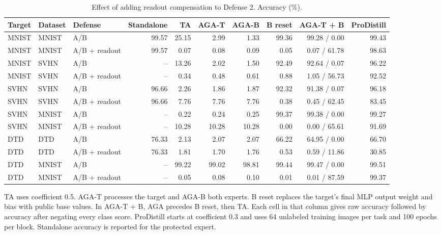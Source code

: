 \begin{table}[t]
\centering\small
\setlength{\tabcolsep}{4pt}
\caption{Effect of adding readout compensation to Defense 2. Accuracy (\%).}
\label{tab:defense2_readout}
\begin{tabular}{@{}lllrrrrrrr@{}}
\toprule
Target & Dataset & Defense & Standalone & TA & AGA-T & AGA-B & B reset & AGA-T + B & ProDistill \\
\midrule
MNIST & MNIST & A/B & 99.57 & 25.15 & 2.99 & 1.33 & 99.36 & 99.28 / 0.00 & 99.43 \\
MNIST & MNIST & A/B + readout & 99.57 & 0.07 & 0.08 & 0.09 & 0.05 & 0.07 / 61.78 & 98.63 \\
MNIST & SVHN & A/B & -- & 13.26 & 2.02 & 1.50 & 92.49 & 92.64 / 0.07 & 96.22 \\
MNIST & SVHN & A/B + readout & -- & 0.34 & 0.48 & 0.61 & 0.88 & 1.05 / 56.73 & 92.52 \\
\midrule
SVHN & SVHN & A/B & 96.66 & 2.26 & 1.86 & 1.87 & 92.32 & 91.38 / 0.07 & 96.18 \\
SVHN & SVHN & A/B + readout & 96.66 & 7.76 & 7.76 & 7.76 & 0.38 & 0.45 / 62.45 & 83.45 \\
SVHN & MNIST & A/B & -- & 0.22 & 0.24 & 0.25 & 99.37 & 99.38 / 0.00 & 99.27 \\
SVHN & MNIST & A/B + readout & -- & 10.28 & 10.28 & 10.28 & 0.00 & 0.00 / 65.61 & 91.69 \\
\midrule
DTD & DTD & A/B & 76.33 & 2.13 & 2.07 & 2.07 & 66.22 & 64.95 / 0.00 & 66.70 \\
DTD & DTD & A/B + readout & 76.33 & 1.81 & 1.70 & 1.76 & 0.53 & 0.59 / 11.86 & 30.85 \\
DTD & MNIST & A/B & -- & 99.22 & 99.02 & 98.81 & 99.44 & 99.47 / 0.00 & 99.51 \\
DTD & MNIST & A/B + readout & -- & 0.05 & 0.08 & 0.10 & 0.01 & 0.01 / 87.59 & 99.37 \\
\bottomrule
\end{tabular}
\par\smallskip
\begin{minipage}{\textwidth}\footnotesize TA uses coefficient 0.5. AGA-T processes the target and AGA-B both experts. B reset replaces the target's final MLP output weight and bias with public base values. In AGA-T + B, AGA precedes B reset, then TA. Each cell in that column gives raw accuracy followed by accuracy after negating every class score. ProDistill starts at coefficient 0.3 and uses 64 unlabeled training images per task and 100 epochs per block. Standalone accuracy is reported for the protected expert.\end{minipage}
\end{table}
